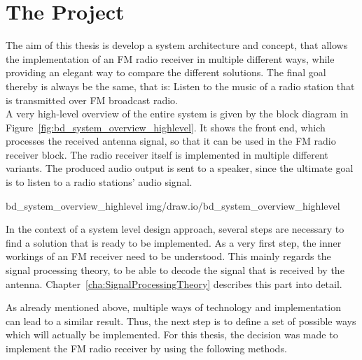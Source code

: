 \section{The Project}

The aim of this thesis is develop a system architecture and concept, that allows the implementation of an FM radio receiver in multiple different ways, while providing an elegant way to compare the different solutions.
The final goal thereby is always be the same, that is: Listen to the music of a radio station that is transmitted over FM broadcast radio.\\

\noindent
A very high-level overview of the entire system is given by the block diagram in Figure~\ref{fig:bd_system_overview_highlevel}.
It shows the front end, which processes the received antenna signal, so that it can be used in the FM radio receiver block.
The radio receiver itself is implemented in multiple different variants.
The produced audio output is sent to a speaker, since the ultimate goal is to listen to a radio stations' audio signal.

 {bd_system_overview_highlevel} {img/draw.io/bd_system_overview_highlevel}

In the context of a system level design approach, several steps are necessary to find a solution that is ready to be implemented.
As a very first step, the inner workings of an FM receiver need to be understood.
This mainly regards the signal processing theory, to be able to decode the signal that is received by the antenna.
Chapter~\ref{cha:SignalProcessingTheory} describes this part into detail.

As already mentioned above, multiple ways of technology and implementation can lead to a similar result.
Thus, the next step is to define a set of possible ways which will actually be implemented.
For this thesis, the decision was made to implement the FM radio receiver by using the following methods.

